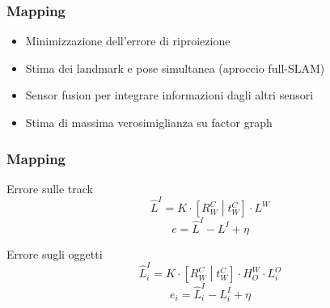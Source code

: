 \documentclass[c]{beamer}
\begin{document}

\begin{frame}
\frametitle{Mapping}

\begin{itemize}
 \item Minimizzazione dell'errore di riproiezione
 \item Stima dei landmark e pose simultanea (aproccio full-SLAM)
 \item Sensor fusion per integrare informazioni dagli altri sensori
 \item Stima di massima verosimiglianza su factor graph
\end{itemize}


\end{frame}


\begin{frame}
\frametitle{Mapping}

\begin{block}{Errore sulle track}
 \begin{equation*}
  \hat{L}^I =  K\cdot \left[  R^C_W \middle| t^C_W  \right] \cdot L^W
 \end{equation*}
 \begin{equation*}
  e = \hat{L}^I - L^I + \eta
 \end{equation*}
\end{block}
\vskip 1cm
\begin{block}{Errore sugli oggetti}
 \begin{equation*}
  \hat{L}^I_i =  K\cdot \left[  R^C_W \middle| t^C_W  \right] \cdot H^W_O \cdot L^O_i
 \end{equation*}
 \begin{equation*}
  e_i = \hat{L}^I_i - L^I_i + \eta
 \end{equation*}
\end{block}



\end{frame}
\end{document}
